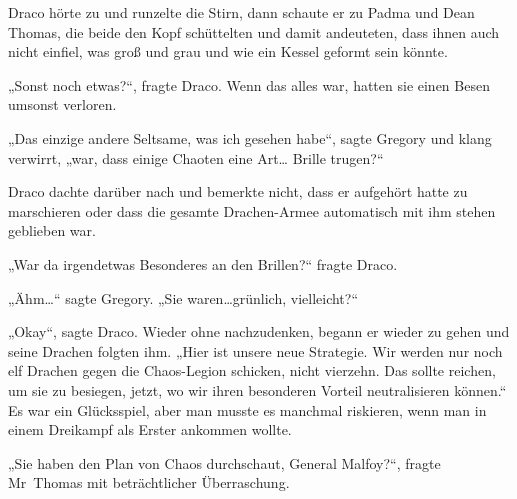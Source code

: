 Draco hörte zu und runzelte die Stirn, dann schaute er zu Padma und Dean Thomas, die beide den Kopf schüttelten und damit andeuteten, dass ihnen auch nicht einfiel, was groß und grau und wie ein Kessel geformt sein könnte.

„Sonst noch etwas?“, fragte Draco. Wenn das alles war, hatten sie einen Besen umsonst verloren.

„Das einzige andere Seltsame, was ich gesehen habe“, sagte Gregory und klang verwirrt, „war, dass einige Chaoten eine Art… Brille trugen?“

Draco dachte darüber nach und bemerkte nicht, dass er aufgehört hatte zu marschieren oder dass die gesamte Drachen-Armee automatisch mit ihm stehen geblieben war.

„War da irgendetwas Besonderes an den Brillen?“ fragte Draco.

„Ähm…“ sagte Gregory. „Sie waren…grünlich, vielleicht?“

„Okay“, sagte Draco. Wieder ohne nachzudenken, begann er wieder zu gehen und seine Drachen folgten ihm. „Hier ist unsere neue Strategie. Wir werden nur noch elf Drachen gegen die Chaos-Legion schicken, nicht vierzehn. Das sollte reichen, um sie zu besiegen, jetzt, wo wir ihren besonderen Vorteil neutralisieren können.“ Es war ein Glücksspiel, aber man musste es manchmal riskieren, wenn man in einem Dreikampf als Erster ankommen wollte.

„Sie haben den Plan von Chaos durchschaut, General Malfoy?“, fragte Mr~Thomas mit beträchtlicher Überraschung.

